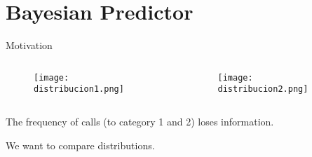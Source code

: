 \documentclass[usenames,dvipsnames]{beamer}
\begin{document}
\section{Bayesian Predictor}



\begin{frame}{Motivation}

\begin{columns}
\begin{column}{0.49\textwidth}

\begin{figure}[h]
\begin{center}
\texttt{[image: distribucion1.png]}
\end{center}
\end{figure}
\end{column}

\begin{column}{0.49\textwidth}

\begin{figure}[h]
\begin{center}
\texttt{[image: distribucion2.png]}
\end{center}
\end{figure}

\end{column}
\end{columns}

\medskip

The frequency of calls (to category 1 and 2) loses information.

We want to compare distributions.

\end{frame}
\end{document}
